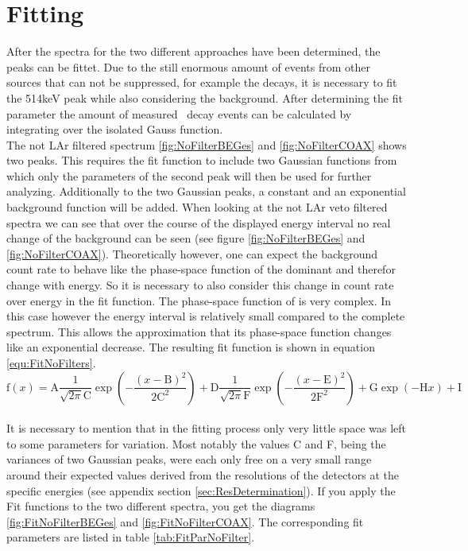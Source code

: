 \documentclass[encoding=utf8,british]{tumphthesis}
\begin{document}
\section{Fitting}
\label{sec:Fitting}

After the spectra for the two different approaches have been determined, the peaks can be fittet.
Due to the still enormous amount of events from other sources that can not be suppressed, for example the  decays, it is necessary to fit the 514keV peak while also considering the background.
After determining the fit parameter the amount of measured \Kr\ decay events can be calculated by integrating over the isolated Gauss function.
\\

The not LAr filtered spectrum \ref{fig:NoFilterBEGes} and \ref{fig:NoFilterCOAX} shows two peaks.
This requires the fit function to include two Gaussian functions from which only the parameters of the second peak will then be used for further analyzing.
Additionally to the two Gaussian peaks, a constant and an exponential background function will be added.
When looking at the not LAr veto filtered spectra we can see that over the course of the displayed energy interval no real change of the background can be seen (see figure \ref{fig:NoFilterBEGes} and \ref{fig:NoFilterCOAX}).
Theoretically however, one can expect the background count rate to behave like the phase-space function of the dominant  and therefor change with energy.
So it is necessary to also consider this change in count rate over energy in the fit function.
The phase-space function of  is very complex.
In this case however the energy interval is relatively small compared to the complete spectrum.
This allows the approximation that its phase-space function changes like an exponential decrease.
The resulting fit function is shown in equation \ref{equ:FitNoFilters}.
\\

\begin{equation}
\mathrm{f}(x) = \mathrm{A}\frac{1}{\sqrt{2\pi}\mathrm{C}}\exp\left(-\frac{(x-\mathrm{B})^2}{2\mathrm{C}^2}\right) + \mathrm{D}\frac{1}{\sqrt{2\pi}\mathrm{F}}\exp\left(-\frac{(x-\mathrm{E})^2}{2\mathrm{F}^2}\right) + \mathrm{G}\exp\left(-\mathrm{H}x\right) + \mathrm{I}
\label{equ:FitNoFilters}
\end{equation}
\\

It is necessary to mention that in the fitting process only very little space was left to some parameters for variation.
Most notably the values C and F, being the variances of two Gaussian peaks, were each only free on a very small range around their expected values derived from the resolutions of the detectors at the specific energies (see appendix section \ref{sec:ResDetermination}).
If you apply the Fit functions to the two different spectra, you get the diagrams \ref{fig:FitNoFilterBEGes} and \ref{fig:FitNoFilterCOAX}.
The corresponding fit parameters are listed in table \ref{tab:FitParNoFilter}. 
\\
\end{document}
